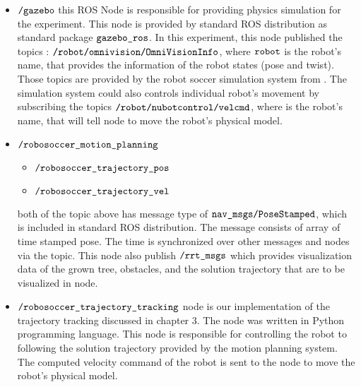 \documentclass[../thesis.tex]{subfiles}
\begin{document}
\begin{itemize}
\item{$\texttt{/gazebo}$} this ROS Node is responsible for providing physics simulation for the experiment. This node is provided by standard ROS distribution as standard package $\texttt{gazebo\_ros}$. In this experiment, this node published the topics : $\texttt{/robot/omnivision/OmniVisionInfo}$, where $\texttt{robot}$ is the robot's name, that provides the information of the robot states (pose and twist). Those topics are provided by the robot soccer simulation system from \cite{yao2015simulation}. The simulation system could also controls individual robot's movement by subscribing the topics $\texttt{/robot/nubotcontrol/velcmd}$, where  is the robot's name, that will tell  node to move the robot's physical model.
\item{$\texttt{/robosoccer\_motion\_planning}$} 
\begin{itemize}[label=$\star$]
\item{$\texttt{/robosoccer\_trajectory\_pos}$} 
\item{$\texttt{/robosoccer\_trajectory\_vel}$}
\end{itemize}
both of the topic above has message type of $\texttt{nav\_msgs/PoseStamped}$, which is included in standard ROS distribution. The message consists of array of time stamped pose. The time is synchronized over other messages and nodes via the  topic. This node also publish $\texttt{/rrt\_msgs}$ which provides visualization data of the grown tree, obstacles, and the solution trajectory that are to be visualized in  node.
\item{$\texttt{/robosoccer\_trajectory\_tracking}$} node is our implementation of the trajectory tracking discussed in chapter 3. The node was written in Python programming language. This node is responsible for controlling the robot to following the solution trajectory provided by the motion planning system. The computed velocity command of the robot is sent to the  node to move the robot's physical model.

\end{itemize}
\end{document}
